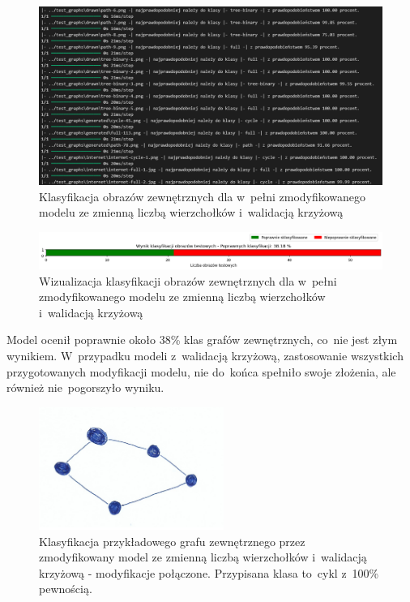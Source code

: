 \begin{figure}[ht]
	\centering
	\includegraphics[width=15.5cm]{resources/tests/images/v4/multiple_edges_crossvalid_txt.png}
	\caption{Klasyfikacja obrazów zewnętrznych dla w~pełni zmodyfikowanego modelu ze zmienną liczbą wierzchołków i~walidacją krzyżową}
	\label{Fig:tests-csvar-2b}
\end{figure}
\FloatBarrier

\begin{figure}[ht]
	\centering
	\includegraphics[width=15.5cm]{resources/tests/images/v4/multiple_edges_crossvalid_bar.png}
	\caption{Wizualizacja klasyfikacji obrazów zewnętrznych dla w~pełni zmodyfikowanego modelu ze zmienną liczbą wierzchołków i~walidacją krzyżową}
	\label{Fig:tests-csvar-2c}
\end{figure}
\FloatBarrier

Model ocenił poprawnie około 38\% klas grafów zewnętrznych, co~nie jest złym wynikiem.
W~przypadku modeli z~walidacją krzyżową, zastosowanie wszystkich przygotowanych modyfikacji modelu,
nie do~końca spełniło swoje złożenia, ale również nie~pogorszyło wyniku.

\begin{figure}[ht]
	\centering
	\includegraphics[height=4cm]{../graph_classification/test_graphs/drawn/cycle-2.png}
	\caption{Klasyfikacja przykładowego grafu zewnętrznego przez zmodyfikowany model
		ze zmienną liczbą wierzchołków i~walidacją krzyżową - modyfikacje połączone.
		Przypisana klasa to~cykl z~100\% pewnością.}
	\label{Fig:tests-cv-2d}
\end{figure}
\FloatBarrier
